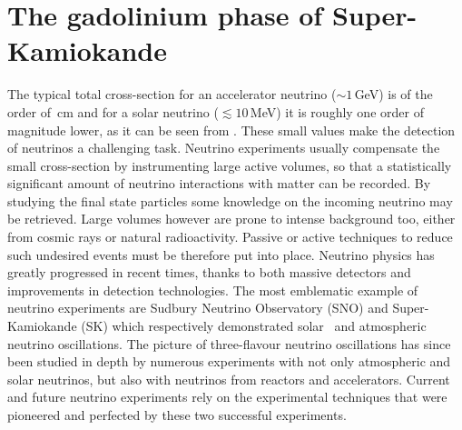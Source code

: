 \chapter{The gadolinium phase of Super-Kamiokande}
\label{cha:skgd}

The typical total cross-section for an accelerator neutrino \mbox{($\sim1$\,GeV)} %
is of the order of \,cm and for a solar neutrino ($\lesssim10$\,MeV) %
it is roughly one order of magnitude lower, as it can be seen from .
These small values make the detection of neutrinos a challenging task.
Neutrino experiments usually compensate the small cross-section by instrumenting large active volumes, %
so that a statistically significant amount of neutrino interactions with matter can be recorded.
By studying the final state particles some knowledge on the incoming neutrino may be retrieved.
Large volumes however are prone to intense background too, either from cosmic rays or natural radioactivity.
Passive or active techniques to reduce such undesired events must be therefore put into place.
Neutrino physics has greatly progressed in recent times, thanks to both massive detectors and %
improvements in detection technologies.
The most emblematic example of neutrino experiments are Sudbury Neutrino Observatory (SNO) and Super-Kamiokande (SK) %
which respectively demonstrated solar~\cite{Aharmim:2005gt} and atmospheric~\cite{Fukuda:1998mi} neutrino oscillations.
The picture of three-flavour neutrino oscillations has since been studied in depth %
by numerous experiments with not only atmospheric and solar neutrinos, but also with neutrinos from reactors and accelerators.
Current and future neutrino experiments rely on the experimental techniques that were pioneered and perfected %
by these two successful experiments.

